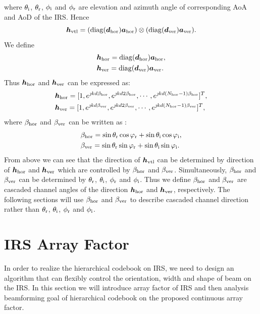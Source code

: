 \documentclass[12pt,draftclsnofoot,onecolumn]{IEEEtran}
\begin{document}
		where $\theta_{\rm i}$, $\theta_{\rm r}$, $\phi_{\rm i}$ and $\phi_{\rm r}$ are elevation and azimuth angle of corresponding AoA and AoD of the IRS.
	Hence
	\begin{equation}
		{\bm h}_{\rm vtl}=({\rm diag}({\bm d}_{\rm hor}){\bm a}_{\rm hor})\otimes({\rm diag}({\bm d}_{\rm ver}){\bm a}_{\rm ver}).
	\end{equation}
	We define
	\begin{align}
		&{\bm h}_{\rm hor}={\rm diag}({\bm d}_{\rm hor}){\bm a}_{\rm hor},\\
		&{\bm h}_{\rm ver}={\rm diag}({\bm d}_{\rm ver}){\bm a}_{\rm ver}.
	\end{align}
	Thus ${\bm h}_{\rm hor}$ and ${\bm h}_{\rm ver}$ can be expressed as:
	\begin{align}
		&{\bm h}_{\rm hor}=[1, e^{\jmath kd\beta_{\rm hor}}, e^{\jmath kd2\beta_{\rm hor}}, \cdots, e^{\jmath kd(N_{\rm hor}-1)\beta_{\rm hor}}]^T,\\
		&{\bm h}_{\rm ver}=[1, e^{\jmath kd\beta_{\rm ver}}, e^{\jmath kd2\beta_{\rm ver}}, \cdots, e^{\jmath kd(N_{\rm hor}-1)\beta_{\rm ver}}]^T,	
	\end{align}
	where $\beta_{\rm hor}$ and $\beta_{\rm ver}$ can be written as \cite{DBLP:journals/wcl/CaiYYHLZ21}:
	\begin{align}
		&{\beta _{\rm hor}} = \sin {\theta _{\rm r}}\cos {\varphi _{\rm r}} + \sin {\theta _{\rm i}}\cos {\varphi _{\rm i}},\label{betah}\\
		&{\beta _{\rm ver}} = \sin {\theta _{\rm r}}\sin {\varphi _{\rm r}} + \sin {\theta _{\rm i}}\sin {\varphi _{\rm i}}.\label{betav}	
	\end{align}
	From above we can see that the direction of ${\bm h}_{\rm vtl}$ can be determined by direction of ${\bm h}_{\rm hor}$ and ${\bm h}_{\rm ver}$ which are controlled by $\beta_{\rm hor}$ and $\beta_{\rm ver}$. Simultaneously, $\beta_{\rm hor}$ and $\beta_{\rm ver}$ can be determined by $\theta_{\rm r}$, $\theta_{\rm i}$, $\phi_{\rm r}$ and $\phi_{\rm i}$. Thus we define $\beta_{\rm hor}$ and $\beta_{\rm ver}$ are cascaded channel angles of the direction ${\bm h}_{\rm hor}$ and ${\bm h}_{\rm ver}$, respectively. The following sections will use $\beta_{\rm hor}$ and $\beta_{\rm ver}$ to describe cascaded channel direction rather than $\theta_{\rm r}$, $\theta_{\rm i}$, $\phi_{\rm r}$ and $\phi_{\rm i}$.
	
	\section{IRS Array Factor}
	In order to realize the hierarchical codebook on IRS, we need to design an algorithm that can flexibly control the orientation, width and shape of beam on the IRS.  In this section we will introduce array factor of IRS and then analysis beamforming goal of hierarchical codebook on the proposed continuous array factor.
	
\end{document}
